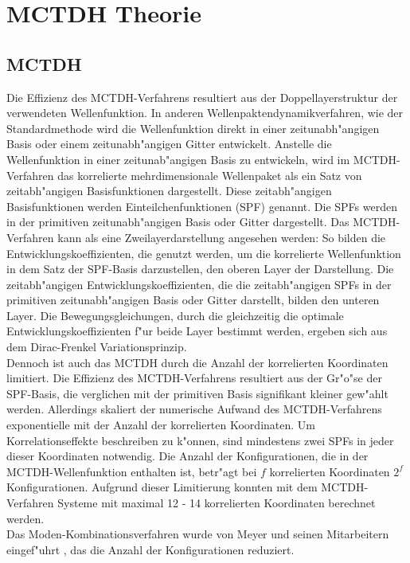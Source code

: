 \chapter{MCTDH Theorie}

\section{MCTDH}
Die Effizienz des MCTDH-Verfahrens resultiert aus der Doppellayerstruktur der verwendeten Wellenfunktion. In anderen Wellenpaktendynamikverfahren, 
wie der Standardmethode \cite{MCTDHreview3} wird die Wellenfunktion direkt in einer zeitunabh"angigen Basis oder einem zeitunabh"angigen Gitter entwickelt. 
Anstelle die Wellenfunktion in einer zeitunab"angigen Basis zu entwickeln,
wird im MCTDH-Verfahren das korrelierte mehrdimensionale Wellenpaket als ein Satz von zeitabh"angigen Basisfunktionen dargestellt.
Diese zeitabh"angigen Basisfunktionen werden Einteilchenfunktionen (SPF) genannt. Die SPFs werden in der primitiven zeitunabh"angigen Basis oder Gitter dargestellt.
Das MCTDH-Verfahren kann als eine Zweilayerdarstellung angesehen werden:
So bilden die Entwicklungskoeffizienten, die genutzt werden, um die korrelierte Wellenfunktion in dem Satz der SPF-Basis darzustellen, den oberen Layer der Darstellung.
Die zeitabh"angigen Entwicklungskoeffizienten, die die zeitabh"angigen SPFs in der primitiven zeitunabh"angigen Basis oder Gitter darstellt, bilden den unteren Layer.
Die Bewegungsgleichungen, durch die gleichzeitig die optimale Entwicklungskoeffizienten f"ur beide Layer bestimmt werden, ergeben sich aus dem Dirac-Frenkel Variationsprinzip.
   \\ Dennoch ist auch das MCTDH durch die Anzahl der korrelierten Koordinaten limitiert. 
Die Effizienz des MCTDH-Verfahrens resultiert aus der Gr"o"se der SPF-Basis, die verglichen mit der primitiven Basis signifikant kleiner gew"ahlt werden.
Allerdings skaliert der numerische Aufwand des MCTDH-Verfahrens exponentielle mit der Anzahl der korrelierten Koordinaten.
Um Korrelationseffekte beschreiben zu k"onnen, sind mindestens zwei SPFs in jeder dieser Koordinaten notwendig.
Die Anzahl der Konfigurationen, die in der MCTDH-Wellenfunktion enthalten ist, betr"agt bei $ f $ korrelierten Koordinaten $ 2^f $ Konfigurationen.
Aufgrund dieser Limitierung konnten mit dem MCTDH-Verfahren Systeme mit maximal 12 - 14 korrelierten Koordinaten  berechnet werden.\cite{HM1, HM2, HM4, WWM, WWM2, HM5,
 WMC, BWHHM}
  \\ Das Moden-Kombinationsverfahren wurde von Meyer und seinen Mitarbeitern eingef"uhrt \cite{EMC, WMC2}, das die Anzahl der Konfigurationen reduziert.
